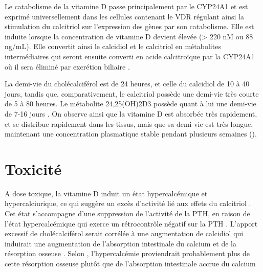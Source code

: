 \documentclass[
  a4paper,
  DIV=11,
  numbers=noendperiod,
  listof=totoc]{scrreprt}
\begin{document}
Le catabolisme de la vitamine D passe principalement par le \ac{CYP24A1}
et est exprimé universellement dans les cellules contenant le \ac{VDR}
régulant ainsi la stimulation du calcitriol sur l'expression des gènes
par son catabolisme. Elle est induite lorsque la concentration de
vitamine D devient élevée (\textgreater{} 220 nM ou 88 ng/mL). Elle
convertit ainsi le calcidiol et le calcitriol en métabolites
intermédiaires qui seront ensuite converti en acide calcitroïque par la
\ac{CYP24A1} où il sera éliminé par excrétion biliaire
\autocite{Schoenmakers.2018,Prosser.2004}.

La demi-vie du cholécalciférol est de 24 heures, et celle du calcidiol
de 10 à 40 jours, tandis que, comparativement, le calcitriol possède une
demi-vie très courte de 5 à 80 heures. Le métabolite \ac{24,25(OH)2D3}
possède quant à lui une demi-vie de 7-16 jours
\autocite{Schoenmakers.2018}. On observe ainsi que la vitamine D est
absorbée très rapidement, et se distribue rapidement dans les tissus,
mais que sa demi-vie est très longue, maintenant une concentration
plasmatique stable pendant plusieurs semaines ().

\section{Toxicité}\label{toxicituxe9}

A dose toxique, la vitamine D induit un état hypercalcémique et
hypercalciurique, ce qui suggère un excès d'activité lié aux effets du
calcitriol \autocite{Vieth.1990}. Cet état s'accompagne d'une
suppression de l'activité de la \ac{PTH}, en raison de l'état
hypercalcémique qui exerce un rétrocontrôle négatif sur la \ac{PTH}
\autocite{Marcinowska-Suchowierska.2018,Dusso.2005}. L'apport excessif
de cholécalciférol serait corrélée à une augmentation de calcidiol qui
induirait une augmentation de l'absorption intestinale du calcium et de
la résorption osseuse \autocite{Jones.2008,IOM.2011}. Selon
\textcite{Shepard.1980}, l'hypercalcémie proviendrait probablement plus
de cette résorption osseuse plutôt que de l'absorption intestinale
accrue du calcium
\end{document}
